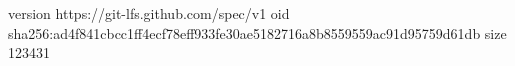 version https://git-lfs.github.com/spec/v1
oid sha256:ad4f841cbcc1ff4ecf78eff933fe30ae5182716a8b8559559ac91d95759d61db
size 123431
